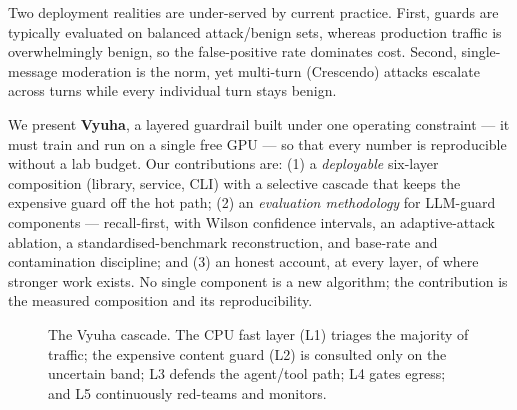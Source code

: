 \documentclass[11pt]{article}
\begin{document}
Two deployment realities are under-served by current practice. First, guards are typically evaluated
on balanced attack/benign sets, whereas production traffic is overwhelmingly benign, so the
false-positive rate dominates cost. Second, single-message moderation is the norm, yet multi-turn
(Crescendo) attacks \citep{crescendo} escalate across turns while every individual turn stays benign.

We present \textbf{Vyuha}, a layered guardrail built under one operating constraint --- it must train
and run on a single free GPU --- so that every number is reproducible without a lab budget. Our
contributions are: (1) a \emph{deployable} six-layer composition (library, service, CLI) with a
selective cascade that keeps the expensive guard off the hot path; (2) an \emph{evaluation
methodology} for LLM-guard components --- recall-first, with Wilson confidence intervals, an
adaptive-attack ablation, a standardised-benchmark reconstruction, and base-rate and contamination
discipline; and (3) an honest account, at every layer, of where stronger work exists. No single
component is a new algorithm; the contribution is the measured composition and its reproducibility.

\begin{figure}[t]
\centering
{}
\caption{The Vyuha cascade. The CPU fast layer (L1) triages the majority of traffic; the expensive
content guard (L2) is consulted only on the uncertain band; L3 defends the agent/tool path; L4 gates
egress; and L5 continuously red-teams and monitors.}
\label{fig:arch}
\end{figure}
\end{document}
